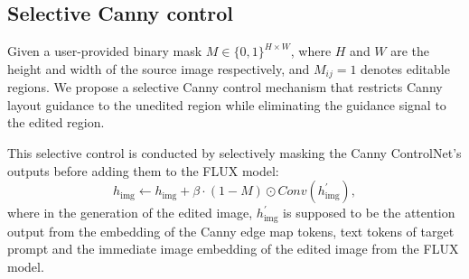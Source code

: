 \documentclass{article}
\begin{document}












\subsection{Selective Canny control}
\label{sec:cannycontrol}

Given a user-provided binary mask \( M \in \{0,1\}^{H \times W} \), where \( H \) and \( W \) are the height and width of the source image respectively, and \( M_{ij} = 1 \) denotes editable regions.  We propose a selective Canny control mechanism that restricts Canny layout guidance to the unedited region while eliminating the guidance signal to the edited region.

This selective control is conducted by selectively masking the Canny ControlNet's outputs before adding them to the FLUX model:
\begin{equation}
h_{\text{img}} \leftarrow h_{\text{img}} + \beta\cdot (1-M) \odot Conv({h}^{\prime}_{\text{img}}),
\label{eq:selective_Canny}
\end{equation}
where in the generation of the edited image, ${h}^{\prime}_{\text{img}}$ is supposed to be the attention output from the embedding of the Canny edge map tokens, text tokens of target prompt and the immediate image embedding of the edited image from the FLUX model. 
\end{document}
